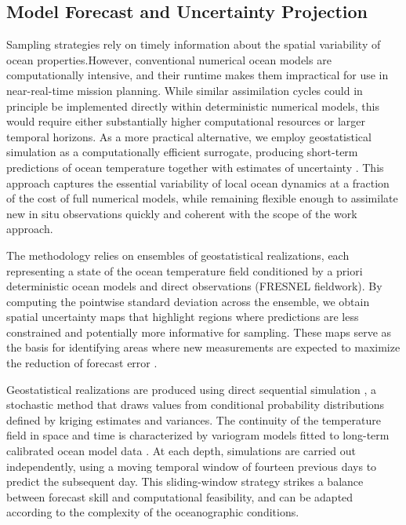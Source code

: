 \subsection{Model Forecast and Uncertainty Projection}
Sampling strategies rely on timely information about the spatial variability of ocean properties.However, conventional numerical ocean models are computationally intensive, and their runtime makes them impractical for use in near-real-time mission planning. While similar assimilation cycles could in principle be implemented directly within deterministic numerical models, this would require either substantially higher computational resources or larger temporal horizons. As a more practical alternative, we employ geostatistical simulation as a computationally efficient surrogate, producing short-term predictions of ocean temperature together with estimates of uncertainty \cite{deutsch1992}. This approach captures the essential variability of local ocean dynamics at a fraction of the cost of full numerical models, while remaining flexible enough to assimilate new in situ observations quickly \cite{Duarte2025} and coherent with the scope of the work approach.

The methodology relies on ensembles of geostatistical realizations, each representing a state of the ocean temperature field conditioned by a priori deterministic ocean models \cite{CMEMS2017} and direct observations (FRESNEL fieldwork). By computing the pointwise standard deviation across the ensemble, we obtain spatial uncertainty maps that highlight regions where predictions are less constrained and potentially more informative for sampling. These maps serve as the basis for identifying areas where new measurements are expected to maximize the reduction of forecast error \cite{Duarte2025}.   

Geostatistical realizations are produced using direct sequential simulation \cite{soares2001direct}, a stochastic method that draws values from conditional probability distributions defined by kriging estimates and variances. The continuity of the temperature field in space and time is characterized by variogram models fitted to long-term calibrated ocean model data \cite{CMEMS2017}. At each depth, simulations are carried out independently, using a moving temporal window of fourteen previous days to predict the subsequent day. This sliding-window strategy strikes a balance between forecast skill and computational feasibility, and can be adapted according to the complexity of the oceanographic conditions.

